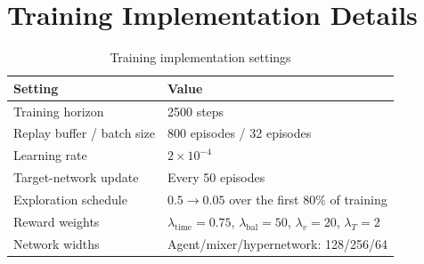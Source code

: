 \appendices
\section{Training Implementation Details}

\begin{table}[H]
\centering
\color{red}
\caption{Training implementation settings}
\label{tab:training_settings}
\scriptsize
\setlength{\tabcolsep}{3pt}
\renewcommand{\arraystretch}{1.03}
\begin{tabular}{@{}p{}p{}@{}}
\toprule
\textbf{Setting} & \textbf{Value} \\
\midrule
Training horizon & 2500 steps \\
Replay buffer / batch size & 800 episodes / 32 episodes \\
Learning rate & $2\times10^{-4}$ \\
Target-network update & Every 50 episodes \\
Exploration schedule & $0.5\rightarrow0.05$ over the first 80\% of training \\
Reward weights & $\lambda_{\mathrm{time}}=0.75$, $\lambda_{\mathrm{bal}}=50$, $\lambda_v=20$, $\lambda_T=2$ \\
Network widths & Agent/mixer/hypernetwork: 128/256/64 \\
\bottomrule
\end{tabular}
\end{table}

